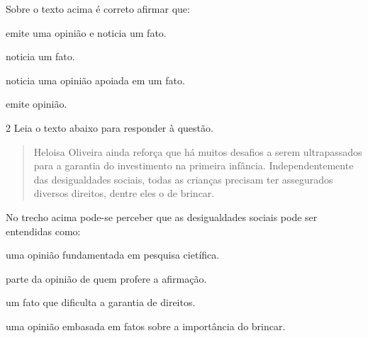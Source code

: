 
Sobre o texto acima é correto afirmar que:

\begin{escolha}

  \item emite uma opinião e noticia um fato.

  \item noticia um fato. 

  \item noticia uma opinião apoiada em um fato.

  \item emite opinião. 

\end{escolha}


\num{2} Leia o texto abaixo para responder à questão. 

\begin{quote}

Heloisa Oliveira ainda reforça que há muitos desafios a serem ultrapassados para a garantia do investimento na primeira infância. Independentemente das desigualdades sociais, todas as crianças precisam ter assegurados diversos direitos, dentre eles o de brincar.

\end{quote}


No trecho acima pode-se perceber que as desigualdades sociais pode ser
entendidas como:

\begin{escolha}

  \item uma opinião fundamentada em pesquisa cietífica.
  
  \item parte da opinião de quem profere a afirmação.
  
  \item um fato que dificulta a garantia de direitos.
  
  \item uma opinião embasada em fatos sobre a importância do brincar.

\end{escolha}


